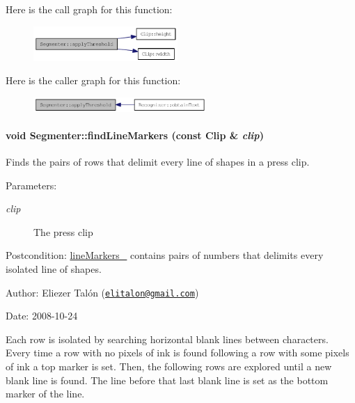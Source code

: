 Here is the call graph for this function:\nopagebreak
\begin{figure}[H]
\begin{center}
\leavevmode
\includegraphics[width=155pt]{class_segmenter_6854315e3320f9d9a8ece14cbb8570ee_cgraph}
\end{center}
\end{figure}


Here is the caller graph for this function:\nopagebreak
\begin{figure}[H]
\begin{center}
\leavevmode
\includegraphics[width=186pt]{class_segmenter_6854315e3320f9d9a8ece14cbb8570ee_icgraph}
\end{center}
\end{figure}
\hypertarget{class_segmenter_ad8893282742e811dd7fff172ec03c85}{
\paragraph[{findLineMarkers}]{\setlength{\rightskip}{0pt plus 5cm}void Segmenter::findLineMarkers (const {\bf Clip} \& {\em clip})}\hfill}
\label{class_segmenter_ad8893282742e811dd7fff172ec03c85}


Finds the pairs of rows that delimit every line of shapes in a press clip. 

\begin{Desc}
\item[Parameters:]
\begin{description}
\item[{\em clip}]The press clip\end{description}
\end{Desc}
\begin{Desc}
\item[Postcondition:]\hyperlink{class_segmenter_2789fd760ed7604765b3b147be454c09}{lineMarkers\_\-} contains pairs of numbers that delimits every isolated line of shapes.\end{Desc}
\begin{Desc}
\item[Author:]Eliezer Talón (\href{mailto:elitalon@gmail.com}{\tt elitalon@gmail.com}) \end{Desc}
\begin{Desc}
\item[Date:]2008-10-24\end{Desc}
Each row is isolated by searching horizontal blank lines between characters. Every time a row with no pixels of ink is found following a row with some pixels of ink a top marker is set. Then, the following rows are explored until a new blank line is found. The line before that last blank line is set as the bottom marker of the line. 

